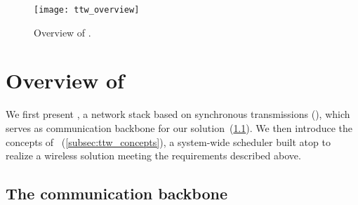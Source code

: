 
\begin{figure}
	\centering
	\texttt{[image: ttw\_overview]}
	\caption{Overview of \TTW.
	}
	\label{fig:ttw_overview}
\end{figure}



\section{Overview of \TTW}
\label{sec:ttw_overview}

We first present \TTnet, a network stack based on synchronous transmissions (\ST), which serves as communication backbone for our solution~(\cref{subsec:ttnet}). We then introduce the concepts of \TTW~(\cref{subsec:ttw_concepts}), a system-wide scheduler built atop \TTnet to realize a wireless \CPS solution meeting the requirements described above.

\subsection{The \TTnet communication backbone}
\label{subsec:ttnet}

